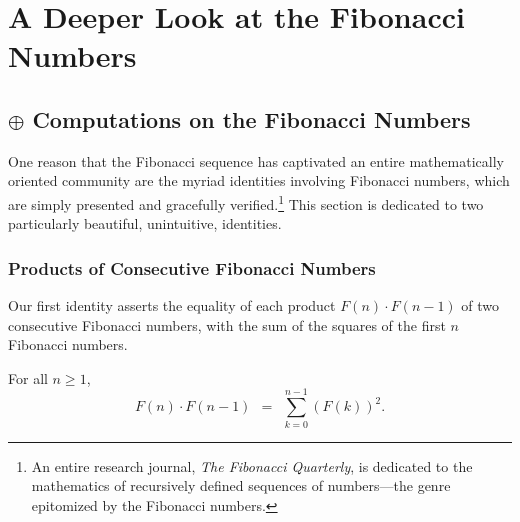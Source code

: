 
\chapter{A Deeper Look at the Fibonacci Numbers}
\label{ch:FIBO-enrich}

\noindent {}


\section{$\oplus$ Computations on the Fibonacci Numbers}
\label{sec:FIBO-enrich-ops}

One reason that the Fibonacci sequence has captivated an entire mathematically oriented community are the myriad identities involving Fibonacci numbers, which are simply presented and gracefully verified.\footnote{An entire research journal, {\it The Fibonacci Quarterly}, is dedicated to the mathematics of recursively defined sequences of numbers---the genre epitomized by the Fibonacci numbers.}  This section is dedicated to two particularly beautiful,  unintuitive, identities.

\subsection{Products of Consecutive Fibonacci Numbers}
\label{sec:product-Fn-Fn+1}

Our first identity asserts the equality of each product $F(n) \cdot F(n-1)$ of two consecutive Fibonacci numbers, with the sum of the squares of the first $n$ Fibonacci numbers.

\begin{prop} 
\label{thm:FiboSumConsecutive}
For all $n \geq 1$,
\begin{equation}
\label{eq:FiboSumConsecutive}
F(n) \cdot F(n-1) \ \ = \ \ \sum_{k=0}^{n-1} (F(k))^2.
\end{equation}
\end{prop}

